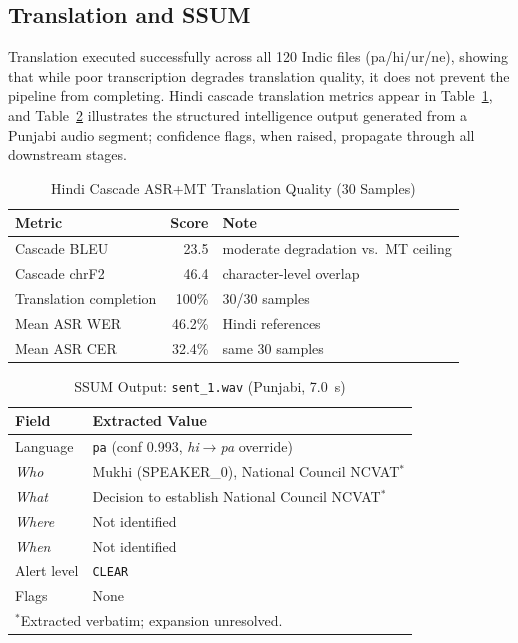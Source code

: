 \documentclass[conference]{IEEEtran}
\begin{document}
\subsection{Translation and SSUM}
\label{sec:trans}

Translation executed successfully across all 120 Indic files (pa/hi/ur/ne), showing that while poor transcription degrades translation quality, it does not prevent the pipeline from completing. Hindi cascade translation metrics appear in Table~\ref{tab:bleu}, and Table~\ref{tab:isum_example} illustrates the structured intelligence output generated from a Punjabi audio segment; confidence flags, when raised, propagate through all downstream stages.

\begin{table}[htbp]
\caption{Hindi Cascade ASR+MT Translation Quality (30 Samples)}
\label{tab:bleu}
\begin{center}
\begin{tabular}{lrl}
\toprule
\textbf{Metric} & \textbf{Score} & \textbf{Note} \\
\midrule
Cascade BLEU & 23.5 & moderate degradation vs.\ MT ceiling \\
Cascade chrF2 & 46.4 & character-level overlap \\
Translation completion  & 100\% & 30/30 samples \\
Mean ASR WER            & 46.2\% & Hindi references \\
Mean ASR CER            & 32.4\% & same 30 samples \\
\bottomrule
\end{tabular}
\end{center}
\end{table}

\begin{table}[htbp]
\caption{SSUM Output: \texttt{sent\_1.wav} (Punjabi, 7.0~s)}
\label{tab:isum_example}
\begin{center}
\begin{tabular}{p{1.5cm}p{5.8cm}}
\toprule
\textbf{Field} & \textbf{Extracted Value} \\
\midrule
Language   & \texttt{pa} (conf 0.993, \textit{hi}$\rightarrow$\textit{pa} override) \\
\textit{Who}   & Mukhi (SPEAKER\_0), National Council NCVAT$^*$ \\
\textit{What}  & Decision to establish National Council NCVAT$^*$ \\
\textit{Where} & Not identified \\
\textit{When}  & Not identified \\
Alert level    & \texttt{CLEAR} \\
Flags          & None \\
\midrule
\multicolumn{2}{l}{\footnotesize $^*$Extracted verbatim; expansion unresolved.} \\
\bottomrule
\end{tabular}
\end{center}
\end{table}
\end{document}
